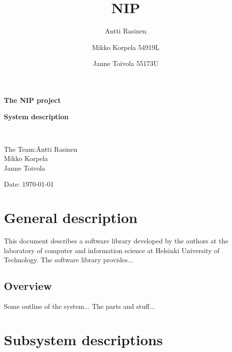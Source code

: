 \documentclass[12pt,a4paper]{report}
\title{NIP}
\author{Antti Rasinen}
\author{Mikko Korpela 54919L}
\author{Janne Toivola 55173U}
\begin{document}
\pagestyle{empty}
\setlength{\parindent}{0mm}
\setlength{\parskip}{3mm}

\large
\textbf{The NIP project}\\

\vspace{45mm}

\begin{centering}
\huge
\textbf{System description}\\ %
\end{centering}

\parbox{5cm}{\ }
\parbox{1em}{\vskip8cm}

\normalsize
\vspace{5mm}
\begin{tabbing}
The Team:\= Antti Rasinen\\
         \> Mikko Korpela\\
         \> Janne Toivola\\
\vspace{5mm}

\end{tabbing}
Date: \today
\eject\newpage

\pagestyle{plain}

\tableofcontents

%




\newpage
\chapter{General description}
This document describes a software library developed by 
the authors at the laboratory of computer and information science at 
Helsinki University of Technology. The software library provides...


\section{Overview}
Some outline of the system... The parts and stuff...



\newpage
\chapter{Subsystem descriptions}
\end{document}
